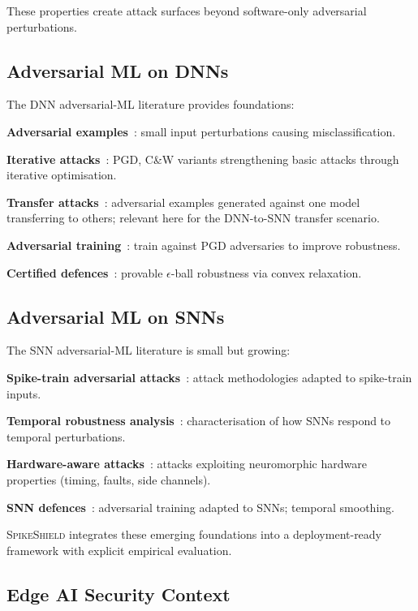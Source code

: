 \documentclass[sigconf,nonacm]{acmart}
\begin{document}
These properties create attack surfaces beyond software-only
adversarial perturbations.

\subsection{Adversarial ML on DNNs}

The DNN adversarial-ML literature provides foundations:

\textbf{Adversarial examples}~\cite{biggio2018wild,
goodfellow2014fgsm}: small input perturbations causing
misclassification.

\textbf{Iterative attacks}~\cite{madry2018towards,carlini2017cw}:
PGD, C\&W variants strengthening basic attacks through iterative
optimisation.

\textbf{Transfer attacks}~\cite{papernot2016transfer}: adversarial
examples generated against one model transferring to others;
relevant here for the DNN-to-SNN transfer scenario.

\textbf{Adversarial training}~\cite{madry2018towards}: train against
PGD adversaries to improve robustness.

\textbf{Certified defences}~\cite{wong2018robust}: provable
$\epsilon$-ball robustness via convex relaxation.

\subsection{Adversarial ML on SNNs}

The SNN adversarial-ML literature is small but growing:

\textbf{Spike-train adversarial attacks}~\cite{el2024sparseadv,
liu2024snnattack}: attack methodologies adapted to spike-train
inputs.

\textbf{Temporal robustness analysis}~\cite{kim2024snnrobust,
sharmin2020snnrobust}: characterisation of how SNNs respond to
temporal perturbations.

\textbf{Hardware-aware attacks}~\cite{venceslai2024snnhwattack,
khalid2024neuromorphsec}: attacks exploiting neuromorphic
hardware properties (timing, faults, side channels).

\textbf{SNN defences}~\cite{sharmin2020snnrobust,
panda2024snntraining}: adversarial training adapted to SNNs;
temporal smoothing.

\textsc{SpikeShield} integrates these emerging foundations into a
deployment-ready framework with explicit empirical evaluation.

\subsection{Edge AI Security Context}
\end{document}
